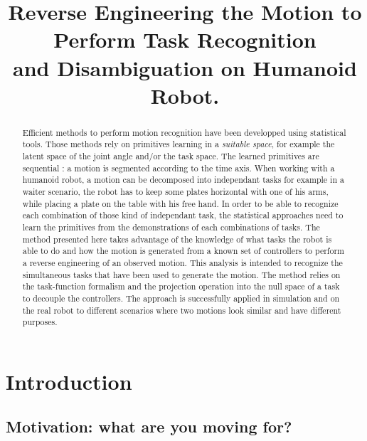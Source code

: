 \documentclass[letterpaper, 10pt, conference]{ieeeconf}      %
\title{\LARGE \bf
Reverse Engineering the Motion to Perform Task Recognition\\ and Disambiguation on Humanoid Robot.
}
\begin{document}
\maketitle
\thispagestyle{empty}
\pagestyle{empty}


\begin{abstract}
Efficient methods to perform motion recognition have been developped
using statistical tools. Those methods rely on primitives learning
in a \emph{suitable space}, for example the latent space of the joint angle and/or the task space.
The learned primitives are sequential : a motion is segmented according to the time axis.
When working with a humanoid robot, a motion can be decomposed into
independant tasks for example in a waiter scenario,
the robot has to keep some plates horizontal with one of his arms, while placing a plate
on the table with his free hand.
In order to be able to recognize each combination of those kind of independant task,
the statistical approaches need to learn the primitives from the demonstrations of each
combinations of tasks.
The method presented here
takes advantage of the knowledge of what tasks the robot is able to do and how
the motion is generated from a known set of controllers to perform a reverse engineering of an
observed motion. This analysis is intended to recognize the simultaneous tasks that
have been used to generate the motion. The method relies
on the task-function formalism and the projection operation into the null space of a task to decouple
the controllers.
The approach is successfully applied in simulation and on the real robot
to different scenarios where two motions look similar and have
different purposes.
\end{abstract}

\section{Introduction}
\subsection{Motivation: what are you moving for?}
\end{document}
